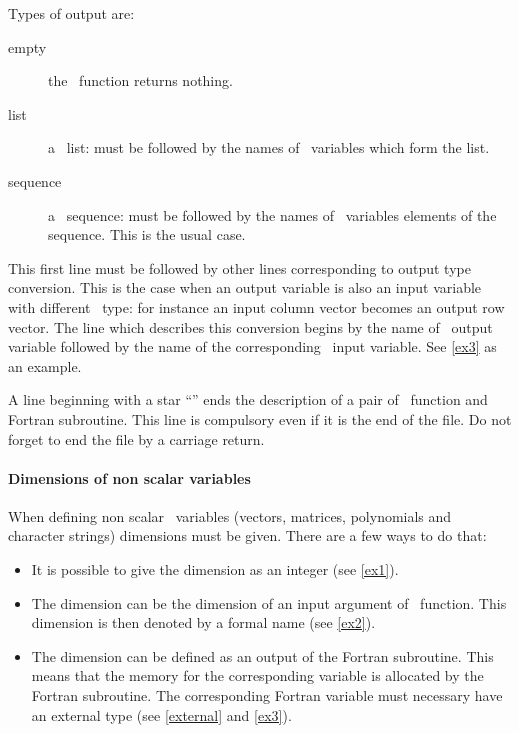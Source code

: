 \smallskip

Types of output are:
\begin{description}
  \item[empty] the \SCI\ function returns nothing.
  \item[list] a \SCI\ list: must be followed by the names of \SCI\ variables
which form the list.
  \item[sequence] a \SCI\ sequence: must be followed by the names of \SCI\
variables elements of the sequence. This is the usual case.
\end{description}

This first line must be followed by other lines corresponding to output type
conversion. This is the case when an output variable is also an input variable
with different \SCI\ type: for instance an input column vector becomes an
output row vector. The line which describes this conversion begins by the name
of \SCI\ output variable followed by the name of the corresponding \SCI\ input
variable. See \ref{ex3} as an example.
\medskip

A line beginning with a star ``\T{*}'' ends the description of a pair of
\SCI\ function and Fortran subroutine. This line is compulsory even if it is
the end of the file. Do not forget to end the file by a carriage return.

\paragraph{Dimensions of non scalar variables}
\label{dimensions}

When defining non scalar \SCI\ variables (vectors, matrices, polynomials and
character strings) dimensions must be given. There are a few ways to do that:

\begin{itemize}
  \item It is possible to give the dimension as an integer (see \ref{ex1}).
  \item The dimension can be the dimension of an input argument of \SCI\
function. This dimension is then denoted by a formal name (see \ref{ex2}). 
  \item The dimension can be defined as an output of the Fortran subroutine.
This means that the memory for the corresponding variable is allocated by the
Fortran subroutine. The corresponding Fortran variable must necessary have an
external type (see \ref{external} and \ref{ex3}).
\end{itemize}

